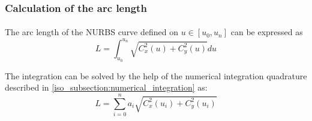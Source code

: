 \subsubsection{Calculation of the arc length}
\paragraph{}
The arc length of the NURBS curve defined on $u \in [u_0, u_n]$ can be expressed as
    \begin{equation}
        L = \int_{u_0} ^{u_n} \sqrt{C_x^2(u) + C_y^2(u)} du
    \end{equation}

The integration can be solved by the help of the numerical integration quadrature described in \ref{iso_subsection:numerical_integration} as:
    \begin{equation}
        L = \sum_{i=0}^n a_i \sqrt{C_x^2(u_i) + C_y^2(u_i)}
    \end{equation}
